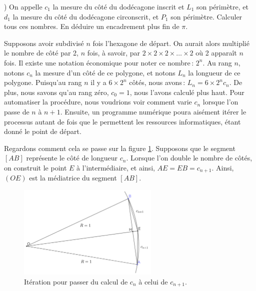 	) On appelle $c_1$ la mesure du côté du dodécagone inscrit et $L_1$ son périmètre, et $d_1$ la mesure du côté du dodécagone circonscrit, et $P_1$ son périmètre. Calculer tous ces nombres. En déduire un encadrement plus fin de $\pi$.

	Supposons avoir subdivisé $n$ fois l'hexagone de départ. On aurait alors multiplié le nombre de côté par 2, $n$ fois, à savoir, par $2\times2\times2\times\ldots\times 2$ où 2 apparaît $n$ fois. Il existe une notation économique pour noter ce nombre\,: $2^n$. Au rang $n$, notons $c_n$ la mesure d'un côté de ce polygone, et notons $L_n$ la longueur de ce polygone. Puisqu'au rang $n$ il y a $6\times 2^n$ côtés, nous avons\,: $L_n=6\times 2^n c_n$. De plus, nous savons qu'au rang zéro, $c_0=1$, nous l'avons calculé plus haut.
	Pour automatiser la procédure, nous voudrions voir comment varie $c_n$ lorsque l'on passe de $n$ à $n+1$. Ensuite, un programme numérique poura aisément itérer le processus autant de fois que le permettent les ressources informatiques, étant donné le point de départ.

	Regardons comment cela se passe sur la figure \ref{fig_iter}. Supposons que le segment $[AB]$ représente le côté de longueur $c_n$. Lorsque l'on double le nombre de côtés, on construit le point $E$ à l'intermédiaire, et ainsi, $AE=EB=c_{n+1}$. Ainsi, $(OE)$ est la médiatrice du segment $[AB]$. 
	\begin{figure}
		\includegraphics[width=0.6\textwidth]{image/pi_nombre/iteration.png}
		\caption{Itération pour passer du calcul de $c_n$ à celui de $c_{n+1}$.}\label{fig_iter}
	\end{figure}

